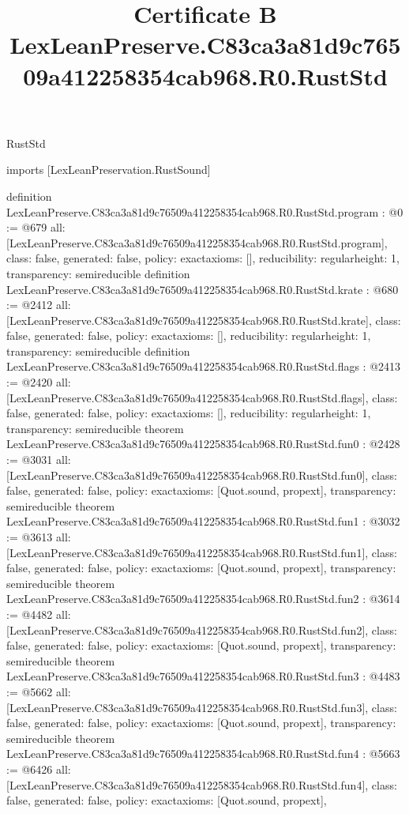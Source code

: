 \begin{lexlean}{RustStd}
\title{Certificate B LexLeanPreserve.C83ca3a81d9c76509a412258354cab968.R0.RustStd}
\begin{coremodule}
imports [LexLeanPreservation.RustSound]

definition LexLeanPreserve.C83ca3a81d9c76509a412258354cab968.R0.RustStd.program : @0 := @679 {
  all: [LexLeanPreserve.C83ca3a81d9c76509a412258354cab968.R0.RustStd.program],
  class: false,
  generated: false,
  policy: exact{axioms: []},
  reducibility: regular{height: 1},
  transparency: semireducible
}
definition LexLeanPreserve.C83ca3a81d9c76509a412258354cab968.R0.RustStd.krate : @680 := @2412 {
  all: [LexLeanPreserve.C83ca3a81d9c76509a412258354cab968.R0.RustStd.krate],
  class: false,
  generated: false,
  policy: exact{axioms: []},
  reducibility: regular{height: 1},
  transparency: semireducible
}
definition LexLeanPreserve.C83ca3a81d9c76509a412258354cab968.R0.RustStd.flags : @2413 := @2420 {
  all: [LexLeanPreserve.C83ca3a81d9c76509a412258354cab968.R0.RustStd.flags],
  class: false,
  generated: false,
  policy: exact{axioms: []},
  reducibility: regular{height: 1},
  transparency: semireducible
}
theorem LexLeanPreserve.C83ca3a81d9c76509a412258354cab968.R0.RustStd.fun0 : @2428 := @3031 {
  all: [LexLeanPreserve.C83ca3a81d9c76509a412258354cab968.R0.RustStd.fun0],
  class: false,
  generated: false,
  policy: exact{axioms: [Quot.sound, propext]},
  transparency: semireducible
}
theorem LexLeanPreserve.C83ca3a81d9c76509a412258354cab968.R0.RustStd.fun1 : @3032 := @3613 {
  all: [LexLeanPreserve.C83ca3a81d9c76509a412258354cab968.R0.RustStd.fun1],
  class: false,
  generated: false,
  policy: exact{axioms: [Quot.sound, propext]},
  transparency: semireducible
}
theorem LexLeanPreserve.C83ca3a81d9c76509a412258354cab968.R0.RustStd.fun2 : @3614 := @4482 {
  all: [LexLeanPreserve.C83ca3a81d9c76509a412258354cab968.R0.RustStd.fun2],
  class: false,
  generated: false,
  policy: exact{axioms: [Quot.sound, propext]},
  transparency: semireducible
}
theorem LexLeanPreserve.C83ca3a81d9c76509a412258354cab968.R0.RustStd.fun3 : @4483 := @5662 {
  all: [LexLeanPreserve.C83ca3a81d9c76509a412258354cab968.R0.RustStd.fun3],
  class: false,
  generated: false,
  policy: exact{axioms: [Quot.sound, propext]},
  transparency: semireducible
}
theorem LexLeanPreserve.C83ca3a81d9c76509a412258354cab968.R0.RustStd.fun4 : @5663 := @6426 {
  all: [LexLeanPreserve.C83ca3a81d9c76509a412258354cab968.R0.RustStd.fun4],
  class: false,
  generated: false,
  policy: exact{axioms: [Quot.sound, propext]},
}
\end{coremodule}
\end{lexlean}
